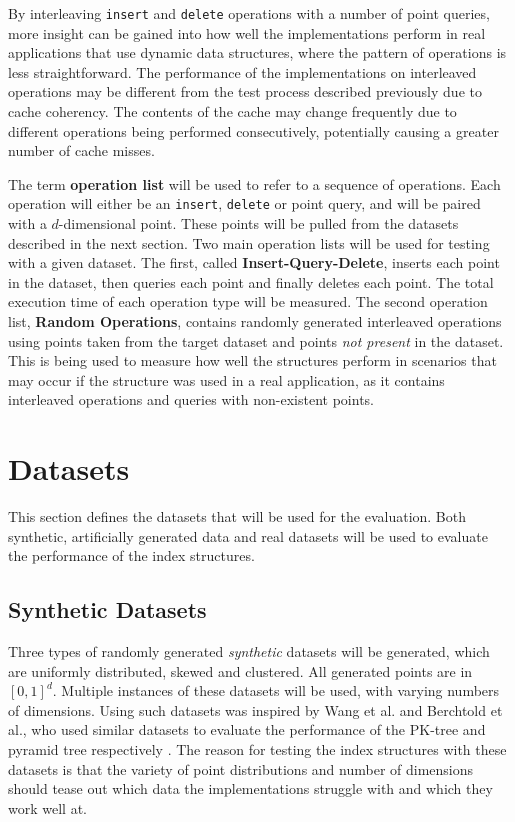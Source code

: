 By interleaving \texttt{insert} and \texttt{delete} operations with a number of point queries, more insight can be gained into how well the implementations perform in real applications that use dynamic data structures, where the pattern of operations is less straightforward. The performance of the implementations on interleaved operations may be different from the test process described previously due to cache coherency. The contents of the cache may change frequently due to different operations being performed consecutively, potentially causing a greater number of cache misses.

The term \textbf{operation list} will be used to refer to a sequence of operations. Each operation will either be an \texttt{insert}, \texttt{delete} or point query, and will be paired with a $d$-dimensional point. These points will be pulled from the datasets described in the next section. Two main operation lists will be used for testing with a given dataset. The first, called \textbf{Insert-Query-Delete}, inserts each point in the dataset, then queries each point and finally deletes each point. The total execution time of each operation type will be measured. The second operation list, \textbf{Random Operations}, contains randomly generated interleaved operations using points taken from the target dataset and points \textit{not present} in the dataset. This is being used to measure how well the structures perform in scenarios that may occur if the structure was used in a real application, as it contains interleaved operations and queries with non-existent points.

\section{Datasets}
\label{sec:datasets}

This section defines the datasets that will be used for the evaluation. Both synthetic, artificially generated data and real datasets will be used to evaluate the performance of the index structures.

\subsection{Synthetic Datasets}

 Three types of randomly generated \textit{synthetic} datasets will be generated, which are uniformly distributed, skewed and clustered. All generated points are in $[0,1]^d$. Multiple instances of these datasets will be used, with varying numbers of dimensions. Using such datasets was inspired by Wang et al. and Berchtold et al., who used similar datasets to evaluate the performance of the PK-tree and pyramid tree respectively \cite{pk-tree, pyramid-tree}. The reason for testing the index structures with these datasets is that the variety of point distributions and number of dimensions should tease out which data the implementations struggle with and which they work well at.

